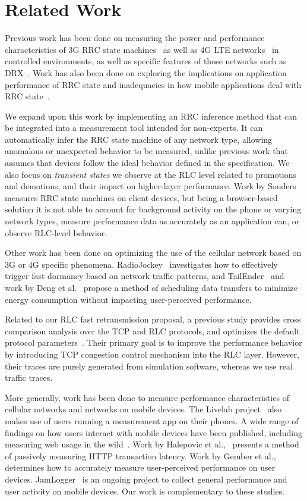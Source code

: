 \section{Related Work}

Previous work has been done on measuring the power and performance characteristics of 3G RRC state machines~\cite{3g_rrc} as well as 4G LTE networks~\cite{4g_rrc, drx_analysis} in controlled environments, as well as specific features of those networks such as DRX~\cite{drx}.  Work has also been done on exploring the implications on application performance of RRC state and inadequacies in how mobile applications deal with RRC state~\cite{aro}.  

We expand upon this work by implementing an RRC inference method that can be integrated into a measurement tool intended for non-experts. It can automatically infer the RRC state machine of any network type, allowing anomalous or unexpected behavior to be measured, unlike previous work that assumes that devices follow the ideal behavior defined in the specification. We also focus on \emph{transient states} we observe at the RLC level related to promotions and demotions, and their impact on higher-layer performance.   Work by Souders~\cite{souder} measures RRC state machines on client devices, but being a browser-based solution it is not able to account for background activity on the phone or varying network types, measure performance data as accurately as an application can, or observe RLC-level behavior.

Other work has been done on optimizing the use of the cellular network based on 3G or 4G specific phenomena. RadioJockey~\cite{radiojockey} investigates how to effectively trigger fast dormancy based on network traffic patterns, and TailEnder~\cite{tailender} and work by Deng et al.~\cite{trafficaware} propose a method of scheduling data transfers to minimize energy consumption without impacting user-perceived performance.


Related to our RLC fast retransmission proposal, a previous study provides cross comparison analysis over the TCP and RLC protocols, and optimizes the default protocol parameters~\cite{opt.tcp.rlc}. Their primary goal is to improve the performance behavior by introducing TCP congestion control mechanism into the RLC layer. However, their traces are purely generated from simulation software, whereas we use real traffic traces. 

More generally, work has been done to measure performance characteristics of cellular networks and networks on mobile devices. The Livelab project~\cite{livelab} also makes use of users running a measurement app on their phones. A wide range of findings on how users interact with mobile devices have been published, including  measuring web usage in the wild~\cite{livelab-webusage}. Work by Halepovic et al.,~\cite{http_measure} presents a method of passively measuring HTTP transaction latency. Work by Gember et al.,~\cite{incontext} determines how to accurately measure user-perceived performance on user devices. JamLogger~\cite{jamlogger} is an ongoing project to collect general performance and user activity on mobile devices. Our work is complementary to these studies.


